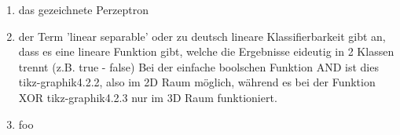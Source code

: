 \begin{enumerate}

	\item das gezeichnete Perzeptron
	

	\item der Term 'linear separable' oder zu deutsch lineare Klassifierbarkeit gibt an, dass es eine lineare Funktion gibt, welche die Ergebnisse eideutig in 2 Klassen trennt (z.B. true - false)
		Bei der einfache boolschen Funktion AND ist dies tikz-graphik4.2.2, also im 2D Raum möglich, während es bei der Funktion XOR tikz-graphik4.2.3 nur im 3D Raum funktioniert.


	\item foo 
\end{enumerate}
